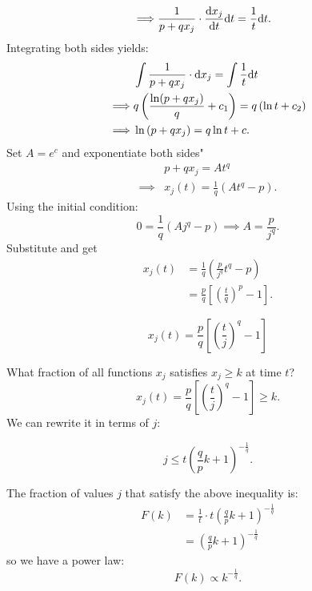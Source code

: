 \documentclass[a4paper,9pt]{extarticle}
\begin{document}
\begin{multicols*}{2}
\begin{align*}
	\implies&\frac{1}{p+qx_{j}}\cdot\frac{\mathrm{d} x_{j}}{\mathrm{d} t}\mathrm{d} t=\frac{1}{t}\mathrm{d} t.
\end{align*}
Integrating both sides yields:
\begin{align*}
	&\int\frac{1}{p+qx_{j}}\cdot\mathrm{d} x_{j}=\int\frac{1}{t}\mathrm{d} t\\
	\implies&q\left(\frac{\ln(p+qx_{j})}{q}+c_{1}\right)=q\left(\ln t+c_{2}\right)\\
	\implies&\ln\left(p+qx_{j}\right)=q\ln t+c.
\end{align*}
Set $A=e^{c}$ and exponentiate both sides"
\begin{align*}
	&p+qx_{j}=At^{q}\\
	\implies&x_{j}(t)=\frac{1}{q}\left(At^{q}-p\right).
\end{align*}
Using the initial condition:
\begin{equation*}
	0=\frac{1}{q}\left(Aj^{q}-p\right)\implies A=\frac{p}{j^{q}}.
\end{equation*}
Substitute and get
\begin{align*}
	x_{j}(t)&=\frac{1}{q}\left(\frac{p}{j^{q}}t^{q}-p\right)\\
	&=\frac{p}{q}\left[{\left(\frac{t}{q}\right)}^{p}-1\right].
\end{align*}
\begin{riquadro}
	\begin{equation*}
		x_{j}(t)=\frac{p}{q}\left[\left(\frac{t}{j}\right)^{q}-1\right]
	\end{equation*}
\end{riquadro}
What fraction of all functions $x_{j}$ satisfies $x_{j}\geq k$ at time $t$?
\begin{equation*}
	x_{j}(t)=\frac{p}{q}\left[\left(\frac{t}{j}\right)^{q}-1\right]\geq k.
\end{equation*}
We can rewrite it in terms of $j$:
\begin{riquadro}
	\begin{equation*}
	j\leq t\left(\frac{q}{p}k+1\right)^{-\frac{1}{q}}.
\end{equation*}
\end{riquadro}
The fraction of values $j$ that satisfy the above inequality is:
\begin{align*}
	F(k)&=\frac{1}{t}\cdot t\left(\frac{q}{p}k+1\right)^{-\frac{1}{q}}\\
	&=\left(\frac{q}{p}k+1\right)^{-\frac{1}{q}}
\end{align*}
so we have a power law:
\begin{equation*}
	F(k)\propto k^{-\frac{1}{q}}.
\end{equation*}

\end{multicols*}
\end{document}
